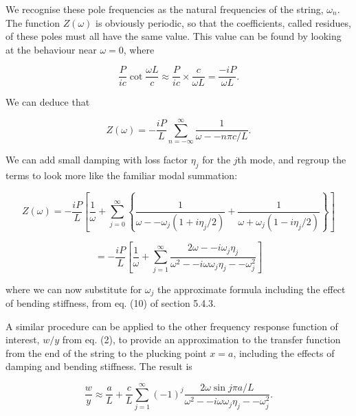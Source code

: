   We recognise these pole frequencies as the natural frequencies of the string, 
  $\omega_n$. The function $Z(\omega)$ is obviously periodic, so that the 
  coefficients, called residues, of these poles must all have the same value. 
  This value can be found by looking at the behaviour near $\omega=0$, where 

  $$\frac{P}{ic}\cot \frac{\omega L}{c} \approx \frac{P}{ic} \times 
  \frac{c}{\omega L}=\frac{-iP}{\omega L}. \tag{6}$$ 

  We can deduce that 

  $$Z(\omega) = -\frac{iP}{L} \sum_{n=-\infty}^{\infty}{\dfrac{1}{\omega -- n 
  \pi c/L}} . \tag{7}$$ 

  We can add small damping with loss factor $\eta_j$ for the $j$th mode, and 
  regroup the terms to look more like the familiar modal summation: 

  $$Z(\omega) = -\frac{iP}{L} \left[ \frac{1}{\omega} + 
  \sum_{j=0}^{\infty}{\left\lbrace \dfrac{1}{\omega -- \omega_j(1+i \eta_j 
  /2)}+\dfrac{1}{\omega + \omega_j(1-i \eta_j /2)}\right\rbrace} \right] $$ 

  $$=-\frac{iP}{L} \left[ \frac{1}{\omega} + \sum_{j=1}^{\infty}{ \dfrac{2 
  \omega -- i \omega_j \eta_j}{\omega^2 -- i\omega \omega_j \eta_j -- 
  \omega_j^2}} \right] \tag{8}$$ 

  where we can now substitute for $\omega_j$ the approximate formula including 
  the effect of bending stiffness, from eq. (10) of section 5.4.3. 

  A similar procedure can be applied to the other frequency response function 
  of interest, $w/y$ from eq. (2), to provide an approximation to the transfer 
  function from the end of the string to the plucking point $x=a$, including 
  the effects of damping and bending stiffness. The result is 

  $$\frac{w}{y} \approx \frac{a}{L} + \frac{c}{L}\sum_{j=1}^{\infty}{ (-1)^j 
  \dfrac{2 \omega \sin j \pi a/L}{\omega^2 -- i\omega \omega_j \eta_j -- 
  \omega_j^2}} . \tag{9}$$ 